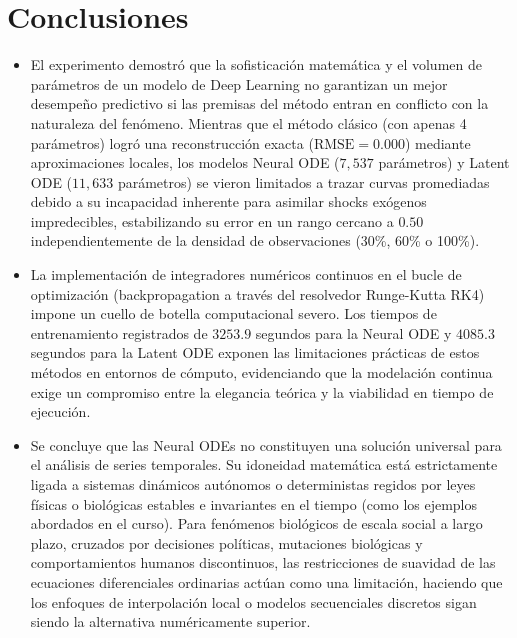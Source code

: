 \documentclass[12pt]{article}
\begin{document}
\section{Conclusiones}

\begin{itemize}
\item El experimento demostró que la sofisticación matemática y el volumen de parámetros de un modelo de Deep Learning no garantizan un mejor desempeño predictivo si las premisas del método entran en conflicto con la naturaleza del fenómeno. Mientras que el método clásico (con apenas 4 parámetros) logró una reconstrucción exacta ($\text{RMSE} = 0.000$) mediante aproximaciones locales, los modelos Neural ODE ($7,537$ parámetros) y Latent ODE ($11,633$ parámetros) se vieron limitados a trazar curvas promediadas debido a su incapacidad inherente para asimilar shocks exógenos impredecibles, estabilizando su error en un rango cercano a $0.50$ independientemente de la densidad de observaciones (30\%, 60\% o 100\%).

\item La implementación de integradores numéricos continuos en el bucle de optimización (backpropagation a través del resolvedor Runge-Kutta RK4) impone un cuello de botella computacional severo. Los tiempos de entrenamiento registrados de $3253.9$ segundos para la Neural ODE y $4085.3$ segundos para la Latent ODE exponen las limitaciones prácticas de estos métodos en entornos de cómputo, evidenciando que la modelación continua exige un compromiso entre la elegancia teórica y la viabilidad en tiempo de ejecución.

\item Se concluye que las Neural ODEs no constituyen una solución universal para el análisis de series temporales. Su idoneidad matemática está estrictamente ligada a sistemas dinámicos autónomos o deterministas regidos por leyes físicas o biológicas estables e invariantes en el tiempo (como los ejemplos abordados en el curso). Para fenómenos biológicos de escala social a largo plazo, cruzados por decisiones políticas, mutaciones biológicas y comportamientos humanos discontinuos, las restricciones de suavidad de las ecuaciones diferenciales ordinarias actúan como una limitación, haciendo que los enfoques de interpolación local o modelos secuenciales discretos sigan siendo la alternativa numéricamente superior.
\end{itemize}
\end{document}

